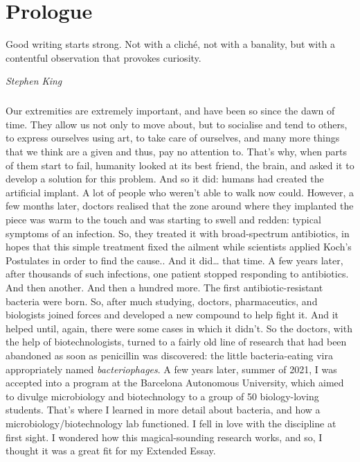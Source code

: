 \chapter{Prologue}
\epigraph{Good writing starts strong. Not with a cliché, not with a banality, but with a contentful observation that provokes curiosity.}{\textit{Stephen King}}
\paragraph{}Our extremities are extremely important, and have been so since the dawn of time. They allow us not only to move about, but to socialise and tend to others, to express ourselves using art, to take care of ourselves, and many more things that we think are a given and thus, pay no attention to. That's why, when parts  of them start to fail, humanity looked at its best friend, the brain, and asked it to develop a solution for this problem. And so it did: humans had created the artificial implant. A lot of people who weren't able to walk now could. However, a few months later, doctors realised that the zone around where they implanted the piece was warm to the touch and was starting to swell and redden: typical symptoms of an infection. So, they treated it with broad-spectrum antibiotics, in hopes that this simple treatment fixed the ailment while scientists applied Koch's Postulates in order to find the cause.. And it did… that time. A few years later, after thousands of such infections, one patient stopped responding to antibiotics. And then another. And then a hundred more. The first antibiotic-resistant bacteria were born. So, after much studying, doctors, pharmaceutics, and biologists joined forces and developed a new compound to help fight it. And it helped until, again, there were some cases in which it didn't. So the doctors, with the help of biotechnologists, turned to a fairly old line of research that had been abandoned as soon as penicillin was discovered: the little bacteria-eating vira appropriately named \emph{bacteriophages}.\newline
A few years later, summer of 2021, I was accepted into a program at the Barcelona Autonomous University, which aimed to divulge microbiology and biotechnology to a group of 50 biology-loving students. That's where I learned in more detail about bacteria, and how a microbiology/biotechnology lab functioned. I fell in love with the discipline at first sight. I wondered how this magical-sounding research works, and so, I thought it was a great fit for my Extended Essay.

